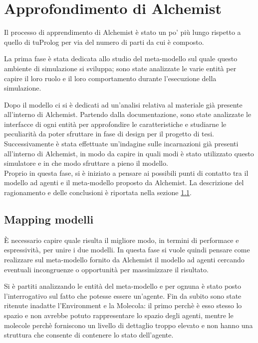 \section{Approfondimento di Alchemist}
Il processo di apprendimento di Alchemist è stato un po' più lungo rispetto a quello di tuProlog per via del numero di parti da cui è composto.

La prima fase è stata dedicata allo studio del meta-modello sul quale questo ambiente di simulazione si sviluppa; sono state analizzate le varie entità per capire il loro ruolo e il loro comportamento durante l'esecuzione della simulazione.

Dopo il modello ci si è dedicati ad un'analisi relativa al materiale già presente all'interno di Alchemist. Partendo dalla documentazione, sono state analizzate le interfacce di ogni entità per approfondire le caratteristiche e studiarne le peculiarità da poter sfruttare in fase di design per il progetto di tesi.
\\
Successivamente è stata effettuate un'indagine sulle incarnazioni già presenti all'interno di Alchemist, in modo da capire in quali modi è stato utilizzato questo simulatore e in che modo sfruttare a pieno il modello.
\\
Proprio in questa fase, si è iniziato a pensare ai possibili punti di contatto tra il modello ad agenti e il meta-modello proposto da Alchemist. La descrizione del ragionamento e delle conclusioni è riportata nella sezione \ref{sctn:mapping}.

\subsection{Mapping modelli}\label{sctn:mapping}
\`E necessario capire quale risulta il migliore modo, in termini di performace e espressività, per unire i due modelli.
In questa fase si vuole quindi pensare come realizzare sul meta-modello fornito da Alchemist il modello ad agenti cercando eventuali incongruenze o opportunità per massimizzare il risultato.

Si è partiti analizzando le entità del meta-modello e per ognuna è stato posto l'interrogativo sul fatto che potesse essere un'agente.
Fin da subito sono state ritenute inadatte l'Environment e la Molecola: il primo perchè è esso stesso lo spazio e non avrebbe potuto rappresentare lo spazio degli agenti, mentre le molecole perchè forniscono un livello di dettaglio troppo elevato e non hanno una struttura che consente di contenere lo stato dell'agente.

